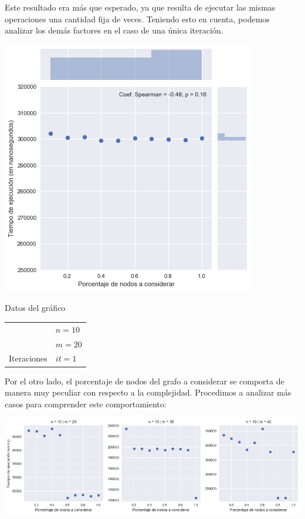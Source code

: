 Este resultado era más que esperado, ya que resulta de ejecutar las mismas operaciones una cantidad fija de veces. Teniendo esto en cuenta, podemos analizar los demás factores en el caso de una única iteración.

\noindent
\begin{minipage}{0.55\textwidth}
    \hfill
    \includegraphics[scale=0.6]{img/grasp-p.png}
\end{minipage}
\hfill
\begin{minipage}{0.44\textwidth}
    \begin{center}
        Datos del gráfico

        \begin{tabular}{ | l l |}
            \hline
             & $n = 10$ \\ 
             & $m = 20$ \\ 
            Iteraciones & $it = 1$ \\
            \hline
        \end{tabular}
    \end{center}
\end{minipage}

Por el otro lado, el porcentaje de nodos del grafo a considerar se comporta de manera muy peculiar con respecto a la complejidad. Procedimos a analizar más casos para comprender este comportamiento:

\begin{center}
    \includegraphics[scale=0.6]{img/grasp-p-multi.png}
\end{center}

